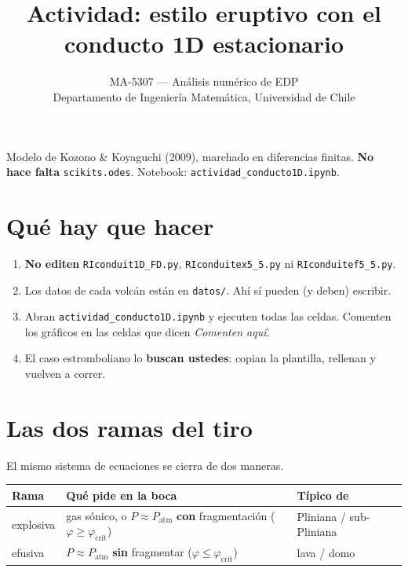 \documentclass[11pt,a4paper]{article}
\title{Actividad: estilo eruptivo con el conducto 1D estacionario}
\author{MA-5307 --- Análisis numérico de EDP \\
Departamento de Ingeniería Matemática, Universidad de Chile}
\date{}
\begin{document}
\maketitle
\thispagestyle{empty}

\noindent
Modelo de Kozono \& Koyaguchi (2009), marchado en diferencias finitas.
\textbf{No hace falta} \texttt{scikits.odes}. Notebook:
\texttt{actividad\_conducto1D.ipynb}.

\section{Qué hay que hacer}

\begin{enumerate}
  \item \textbf{No editen} \texttt{RIconduit1D\_FD.py},
        \texttt{RIconduitex5\_5.py} ni \texttt{RIconduitef5\_5.py}.
  \item Los datos de cada volcán están en \texttt{datos/}.
        Ahí sí pueden (y deben) escribir.
  \item Abran \texttt{actividad\_conducto1D.ipynb} y ejecuten todas las celdas.
        Comenten los gráficos en las celdas que dicen \emph{Comenten aquí}.
  \item El caso estromboliano lo \textbf{buscan ustedes}: copian la plantilla,
        rellenan y vuelven a correr.
\end{enumerate}

\section{Las dos ramas del tiro}

El mismo sistema de ecuaciones se cierra de dos maneras.

\begin{center}
\begin{tabular}{@{}>{\raggedright\arraybackslash}p{}
                >{\raggedright\arraybackslash}p{}
                >{\raggedright\arraybackslash}p{}@{}}
\toprule
\textbf{Rama} & \textbf{Qué pide en la boca} & \textbf{Típico de} \\
\midrule
explosiva
  & gas sónico, o $P\approx P_{\mathrm{atm}}$ \textbf{con} fragmentación
    ($\varphi\ge\varphi_{\mathrm{crit}}$)
  & Pliniana / sub-Pliniana \\[0.6em]
efusiva
  & $P\approx P_{\mathrm{atm}}$ \textbf{sin} fragmentar
    ($\varphi\le\varphi_{\mathrm{crit}}$)
  & lava / domo \\
\bottomrule
\end{tabular}
\end{center}
\end{document}
